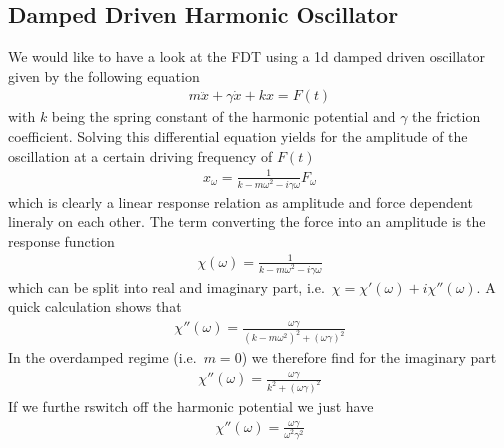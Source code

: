 \documentclass[letterpaper,10pt,english]{sphinxmanual}
\begin{document}
\subsection{Damped Driven Harmonic Oscillator}
\label{\detokenize{notebooks/L16/1_langevin:Damped-Driven-Harmonic-Oscillator}}
\sphinxAtStartPar
We would like to have a look at the FDT using a 1d damped driven oscillator given by the following equation
\begin{equation*}
\begin{split}m\ddot{x}+\gamma \dot{x}+kx=F(t)\end{split}
\end{equation*}
\sphinxAtStartPar
with \(k\) being the spring constant of the harmonic potential and \(\gamma\) the friction coefficient. Solving this differential equation yields for the amplitude of the oscillation at a certain driving frequency of \(F(t)\)
\begin{equation*}
\begin{split}x_{\omega}=\frac{1}{k-m\omega^2-i\gamma \omega}F_{\omega}\end{split}
\end{equation*}
\sphinxAtStartPar
which is clearly a linear response relation as amplitude and force dependent lineraly on each other. The term converting the force into an amplitude is the response function
\begin{equation*}
\begin{split}\chi(\omega)=\frac{1}{k-m\omega^2-i\gamma \omega} \tag{response function}\end{split}
\end{equation*}
\sphinxAtStartPar
which can be split into real and imaginary part, i.e. \(\chi=\chi'(\omega)+i\chi'' (\omega)\). A quick calculation shows that
\begin{equation*}
\begin{split}\chi''(\omega)=\frac{\omega \gamma}{(k-m\omega^2)^2+(\omega \gamma)^2}\end{split}
\end{equation*}
\sphinxAtStartPar
In the overdamped regime (i.e. \(m=0\)) we therefore find for the imaginary part
\begin{equation*}
\begin{split}\chi''(\omega)=\frac{\omega \gamma}{k^2+(\omega \gamma)^2}\end{split}
\end{equation*}
\sphinxAtStartPar
If we furthe rswitch off the harmonic potential we just have
\begin{equation*}
\begin{split}\chi''(\omega)=\frac{\omega \gamma}{\omega^2 \gamma^2}\end{split}
\end{equation*}
\end{document}
